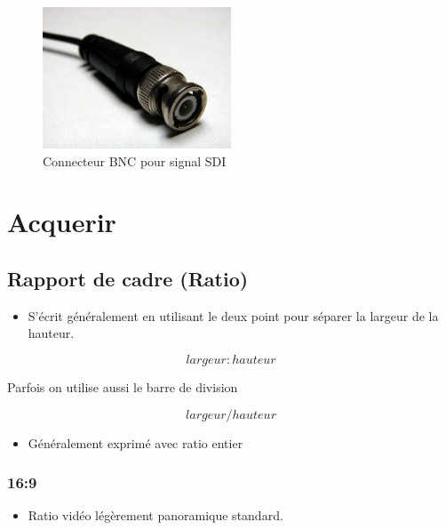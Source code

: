 \documentclass[
  french,
]{book}
\providecommand{\tightlist}{%
  \setlength{\itemsep}{0pt}\setlength{\parskip}{0pt}}
\begin{document}
\begin{figure}
\centering
\includegraphics[width=0.5\textwidth,height=\textheight]{medias/lexique/signaux/numerique/sdi.jpg}
\caption{Connecteur BNC pour signal SDI}
\end{figure}

\hypertarget{acquerir}{%
\chapter{Acquerir}\label{acquerir}}

\hypertarget{rapport-de-cadre-ratio}{%
\section{Rapport de cadre (Ratio)}\label{rapport-de-cadre-ratio}}

\begin{itemize}
\tightlist
\item
  S'écrit généralement en utilisant le deux point pour séparer la largeur de la hauteur.
\end{itemize}

\[
largeur : hauteur 
\]

Parfois on utilise aussi le barre de division

\[
largeur / hauteur 
\]

\begin{itemize}
\tightlist
\item
  Généralement exprimé avec ratio entier
\end{itemize}

\hypertarget{section-1}{%
\subsection{16:9}\label{section-1}}

\begin{itemize}
\tightlist
\item
  Ratio vidéo légèrement panoramique standard.
\end{itemize}
\end{document}
